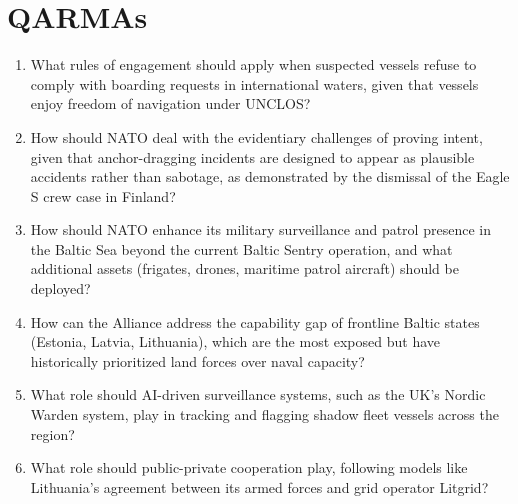 \section{QARMAs}

\begin{enumerate}
  \item What rules of engagement should apply when suspected vessels refuse to comply with boarding requests in international waters, given that vessels enjoy freedom of navigation under UNCLOS?
  \item How should NATO deal with the evidentiary challenges of proving intent, given that anchor-dragging incidents are designed to appear as plausible accidents rather than sabotage, as demonstrated by the dismissal of the Eagle S crew case in Finland?
  \item How should NATO enhance its military surveillance and patrol presence in the Baltic Sea beyond the current Baltic Sentry operation, and what additional assets (frigates, drones, maritime patrol aircraft) should be deployed?
  \item How can the Alliance address the capability gap of frontline Baltic states (Estonia, Latvia, Lithuania), which are the most exposed but have historically prioritized land forces over naval capacity?
  \item What role should AI-driven surveillance systems, such as the UK's Nordic Warden system, play in tracking and flagging shadow fleet vessels across the region?
  \item What role should public-private cooperation play, following models like Lithuania's agreement between its armed forces and grid operator Litgrid?
\end{enumerate}
